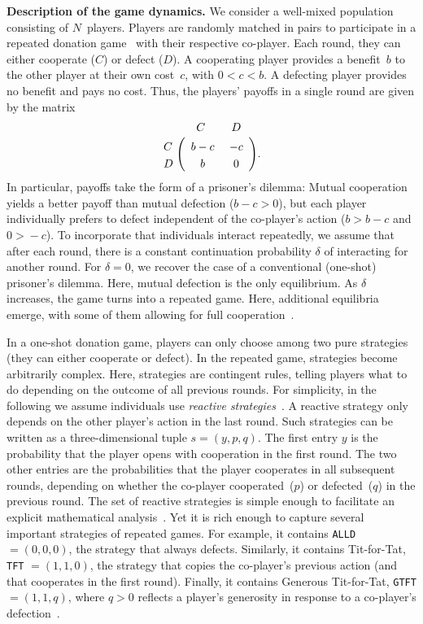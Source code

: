 \documentclass[11pt]{article}
\def\alld{\texttt{ALLD}}
\def\tft{\texttt{TFT}}
\def\gtft{\texttt{GTFT}}
\def\strategy{s}
\theoremstyle{plainCl1}
\theoremstyle{plainCl2}
\begin{document}
\noindent
{\bf Description of the game dynamics.} We consider a well-mixed population consisting of $N$~players.
Players are randomly matched in pairs to participate in a repeated donation game~\citep{sigmund2010calculus} with their respective co-player.
Each round, they can either cooperate (\(C\)) or defect (\(D\)). 
A cooperating player provides a benefit~\(b\) to the other player at their own cost~\(c\), with \(0 \!<\! c \!<\! b\). 
A defecting player provides no benefit and pays no cost. 
Thus, the players' payoffs in a single round are given by the matrix
\begin{align}
\bordermatrix{%
	& C & D \cr
C &\ b-c &\ -c\  \cr
D &\ b &\ 0\ \cr
} .
\end{align}
In particular, payoffs take the form of a prisoner's dilemma:
Mutual cooperation yields a better payoff than mutual defection ($b\!-\!c\!>\!0$), but each player individually prefers to defect independent of the co-player's action ($b\!>\!b\!-\!c$ and $0\!>\!-c$). 
To incorporate that individuals interact repeatedly, we assume that after each round, there is a constant continuation probability $\delta$ of interacting for another round. 
For $\delta\!=\!0$, we recover the case of a conventional (one-shot) prisoner's dilemma. 
Here, mutual defection is the only equilibrium. 
As $\delta$ increases, the game turns into a repeated game. Here, additional equilibria emerge, with some of them allowing for full cooperation~\citep{friedman:RES:1971,Akin:chapter:2016,hilbe:GEB:2015,stewart:pnas:2014}. 



In a one-shot donation game, players can only choose among two pure strategies (they can either cooperate or defect).
In the repeated game, strategies become arbitrarily complex. 
Here, strategies are contingent rules, telling players what to do depending on the outcome of all previous rounds. 
For simplicity, in the following we assume individuals use {\it reactive strategies}~\citep{Nowak1992tit}. 
A reactive strategy only depends on the other player's action in the last round. 
Such strategies can be written as a three-dimensional tuple \(\strategy=(y, p,q)\).
The first entry \(y\) is the probability that the player opens with cooperation in the first round. 
The two other entries are the probabilities that the player cooperates in all subsequent rounds, depending on whether the co-player cooperated~($p$) or defected~($q$) in the previous round. 
The set of reactive strategies is simple enough to facilitate an explicit mathematical analysis~\citep{hofbauer1998evolutionary}. 
Yet it is rich enough to capture several important strategies of repeated games. 
For example, it contains \alld{} $=\!(0,0,0)$, the strategy that always defects. 
Similarly, it contains Tit-for-Tat, \tft{} $=\!(1,1,0)$, the strategy that copies the co-player's previous action (and that cooperates in the first round). 
Finally, it contains Generous Tit-for-Tat, \gtft $=\!(1,1,q)$, where $q\!>\!0$ reflects a player's generosity in response to a co-player's defection~\citep{molander:jcr:1985,Nowak1992tit}.  
\end{document}
